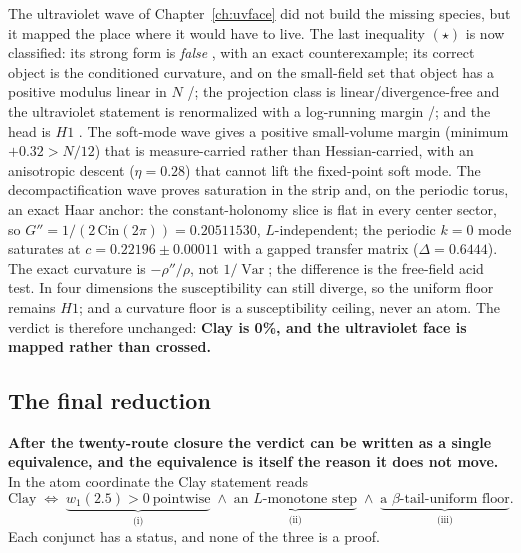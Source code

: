 The ultraviolet wave of Chapter~\ref{ch:uvface} did not build the missing species, but it mapped the
place where it would have to live. The last inequality $(\star)$ is now classified: its strong form
is \emph{false} \LN, with an exact counterexample; its correct object is the conditioned curvature,
and on the small-field set that object has a positive modulus linear in $N$ \LT/\LC; the projection
class is linear/divergence-free and the ultraviolet statement is renormalized with a log-running
margin \LT/\LC; and the head is $H1$ \LM. The soft-mode wave gives a positive small-volume margin
(minimum $+0.32>N/12$) that is measure-carried rather than Hessian-carried, with an anisotropic
descent ($\eta=0.28$) that cannot lift the fixed-point soft mode. The decompactification wave proves
saturation in the strip and, on the periodic torus, an exact Haar anchor: the constant-holonomy slice
is flat in every center sector, so $G''=1/(2\,\mathrm{Cin}(2\pi))=0.20511530$, $L$-independent; the
periodic $k=0$ mode saturates at $c=0.22196\pm0.00011$ with a gapped transfer matrix
($\Delta=0.6444$). The exact curvature is $-\rho''/\rho$, not $1/\operatorname{Var}$; the difference
is the free-field acid test. In four dimensions the susceptibility can still diverge, so the uniform
floor remains $H1$; and a curvature floor is a susceptibility ceiling, never an atom. The verdict is
therefore unchanged: \textbf{Clay is 0\%, and the ultraviolet face is mapped rather than crossed.}

\subsection{The final reduction}
\label{sec:final-reduction}

\textbf{After the twenty-route closure the verdict can be written as a single equivalence, and the
equivalence is itself the reason it does not move.} In the atom coordinate the Clay statement
reads
\[
\text{Clay}\;\Longleftrightarrow\;
\underbrace{w_1(2.5)>0\ \text{pointwise}}_{\text{(i)}}
\;\wedge\;
\underbrace{\text{an }L\text{-monotone step}}_{\text{(ii)}}
\;\wedge\;
\underbrace{\text{a }\beta\text{-tail-uniform floor}}_{\text{(iii)}} .
\]
Each conjunct has a status, and none of the three is a proof.

